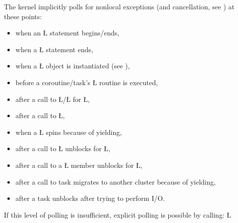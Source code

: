 \documentclass[openright,twoside]{report}
\begin{document}
The\label{p:ListPollingPoints} \uC kernel implicitly polls for nonlocal exceptions (and cancellation, see ) at these points:
\begin{itemize}[topsep=3pt,parsep=0pt,itemsep=0pt]
\item when an \LGinlinetrue\LGbegin\lgrinde\L{}\endlgrinde\LGend{} statement begins/ends,
\item when a \LGinlinetrue\LGbegin\lgrinde\L{}\endlgrinde\LGend{} statement ends,
\item when a \LGinlinetrue\LGbegin\lgrinde\L{}\endlgrinde\LGend{} object is instantiated (see ),
\item before a coroutine/task's \LGinlinetrue\LGbegin\lgrinde\L{}\endlgrinde\LGend{} routine is executed,
\item after a call to \LGinlinetrue\LGbegin\lgrinde\L{}\endlgrinde\LGend{}/\LGinlinetrue\LGbegin\lgrinde\L{}\endlgrinde\LGend{} for \LGinlinetrue\LGbegin\lgrinde\L{}\endlgrinde\LGend{},
\item after a call to \LGinlinetrue\LGbegin\lgrinde\L{}\endlgrinde\LGend{},
\item when a \LGinlinetrue\LGbegin\lgrinde\L{}\endlgrinde\LGend{} spins because of yielding,
\item after a call to \LGinlinetrue\LGbegin\lgrinde\L{}\endlgrinde\LGend{} unblocks for \LGinlinetrue\LGbegin\lgrinde\L{}\endlgrinde\LGend{},
\item after a call to a \LGinlinetrue\LGbegin\lgrinde\L{}\endlgrinde\LGend{} member unblocks for \LGinlinetrue\LGbegin\lgrinde\L{}\endlgrinde\LGend{},
\item after a call to task migrates to another cluster because of yielding,
\item after a task unblocks after trying to perform I/O.
\end{itemize}
If this level of polling is insufficient, explicit polling is possible by calling:
\LGinlinefalse\LGbegin\lgrinde
\L{}
\endlgrinde\LGend
{}%
\end{document}
